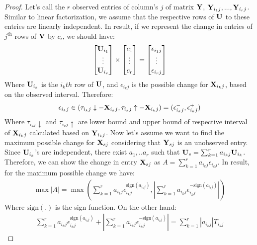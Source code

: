 \documentclass{article}
\begin{document}
\begin{thm:thm}
\begin{proof}
Let's call the $r$ observed entries of column's $j$ of matrix $\mathbf{Y}$, $\mathbf{Y}_{i_{1}j},...,\mathbf{Y}_{i_{r}j}$. Similar to linear factorization, we assume that the respective rows of $\mathbf{U}$ to these entries are linearly independent. In result, if we represent the change in entries of $j^\text{th}$ rows of $\mathbf{V}$ by $c_i$, we should have:
\begin{align}
\begin{bmatrix}
\mathbf{U}_{i_1}\\ 
\vdots \\ 
\mathbf{U}_{i_r}
\end{bmatrix}
\times
\begin{bmatrix}
c_1\\ 
\vdots \\ 
c_r
\end{bmatrix}
=
\begin{bmatrix}
\epsilon_{i_1j}\\ 
\vdots \\ 
\epsilon_{i_rj}
\end{bmatrix}
\end{align}            
Where $\mathbf{U}_{i_k}$ is the $i_k th$ row of $\mathbf{U}$, and $\epsilon_{i_kj}$ is the possible change for $\mathbf{X}_{i_{k}j}$, based on the observed interval. Therefore:
\begin{align}
\epsilon_{i_kj} \in (\tau_{i_kj}\downarrow-\mathbf{X}_{i_kj},\tau_{i_kj}\uparrow-\mathbf{X}_{i_kj})=(\epsilon_{i_kj}^-,\epsilon_{i_kj}^+)
\end{align}
Where $\tau_{i_kj}\downarrow$ and $\tau_{i_kj}\uparrow$ are lower bound and upper bound of respective interval of $\mathbf{X}_{i_kj}$ calculated based on $\mathbf{Y}_{i_kj}$.
Now let's assume we want to find the maximum possible change for $\mathbf{X}_{sj}$ considering that $\mathbf{Y}_{sj}$ is an unobserved entry. Since $\mathbf{U}_{i_k}$'s are independent, there exist $a_1,..a_r$ such that
$
\mathbf{U}_s=\sum_{k=1}^{r}a_{i_kj}\mathbf{U}_{i_k}
$.
Therefore, we can show the change in entry $\mathbf{X}_{sj}$ as
$
A=\sum_{k=1}^{r}a_{i_kj}\epsilon_{i_kj}
$.
In result, for the maximum possible change we have:
\begin{align}
\max|A|=\max(\sum_{k=1}^{r}a_{i_kj}\epsilon_{i_kj}^{\text{sign}(a_{i_kj})},|\sum_{k=1}^{r}a_{i_kj}\epsilon_{i_kj}^{-\text{sign}(a_{i_kj})}|)
\end{align}
Where $\text{sign}(.)$ is the sign function. On the other hand: %
\begin{align}
\sum_{k=1}^{r}a_{i_kj}\epsilon_{i_kj}^{\text{sign}(a_{i_kj})}+|\sum_{k=1}^{r}a_{i_kj}\epsilon_{i_kj}^{-\text{sign}(a_{i_kj})}|=\sum_{k=1}^{r}|a_{i_kj}|T_{i_kj}
\end{align}

\end{proof}
\end{thm:thm}
\end{document}
